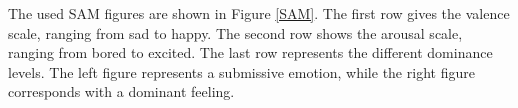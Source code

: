 \npar

The used SAM figures are shown in Figure \ref{SAM}. The first row gives the valence scale, ranging from sad to happy. The second row shows the arousal scale, ranging from bored to excited. The last row represents the different dominance levels. The left figure represents a submissive emotion, while the right figure corresponds with a dominant feeling.

